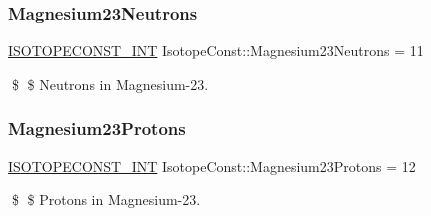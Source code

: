 \subsubsection{\texorpdfstring{Magnesium23\+Neutrons}{Magnesium23Neutrons}}
{\footnotesize\ttfamily \mbox{\hyperlink{group___isotope_const-_macros_ga5f18360b3e99483a35c32d789e62621c}{I\+S\+O\+T\+O\+P\+E\+C\+O\+N\+S\+T\+\_\+\+I\+NT}} Isotope\+Const\+::\+Magnesium23\+Neutrons = 11}

\$ \$ Neutrons in Magnesium-\/23. \mbox{\label{group___isotope_const-_magnesium-_mg23_gac177d9888eddcdbb573321fae8de81c4}} 
\subsubsection{\texorpdfstring{Magnesium23\+Protons}{Magnesium23Protons}}
{\footnotesize\ttfamily \mbox{\hyperlink{group___isotope_const-_macros_ga5f18360b3e99483a35c32d789e62621c}{I\+S\+O\+T\+O\+P\+E\+C\+O\+N\+S\+T\+\_\+\+I\+NT}} Isotope\+Const\+::\+Magnesium23\+Protons = 12}

\$ \$ Protons in Magnesium-\/23. 